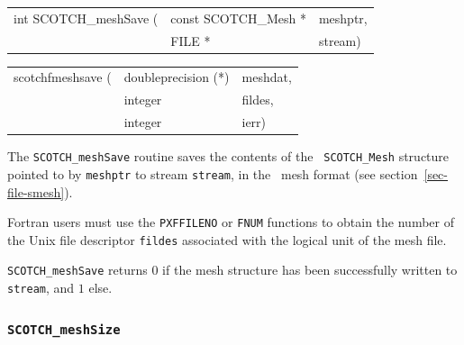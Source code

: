 \begin{itemize}
\progsyn

{\tt\begin{tabular}{l@{}ll}
int SCOTCH\_meshSave ( & const SCOTCH\_Mesh * & meshptr, \\
                       & FILE *               & stream)
\end{tabular}}

{\tt\begin{tabular}{l@{}ll}
scotchfmeshsave ( & doubleprecision (*) & meshdat, \\
                  & integer             & fildes,  \\
                  & integer             & ierr)
\end{tabular}}

\progdes

The {\tt SCOTCH\_meshSave} routine saves the contents of the {\tt
SCOTCH\_\lbt Mesh} structure pointed to by {\tt meshptr} to stream
{\tt stream}, in the \scotch\ mesh format (see
section~\ref{sec-file-smesh}).

Fortran users must use the {\tt PXFFILENO} or {\tt FNUM} functions to
obtain the number of the Unix file descriptor {\tt fildes} associated
with the logical unit of the mesh file.

\progret

{\tt SCOTCH\_meshSave} returns $0$ if the mesh structure has been
successfully written to {\tt stream}, and $1$ else.
\end{itemize}

\subsubsection{{\tt SCOTCH\_meshSize}}

